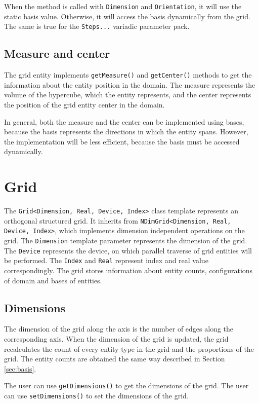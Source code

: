 When the method is called with \texttt{Dimension} and \texttt{Orientation}, it will use the static basis value.
Otherwise, it will access the basis dynamically from the grid.
The same is true for the \texttt{Steps...} variadic parameter pack.

\subsection{Measure and center}

The grid entity implements \texttt{getMeasure()} and \texttt{getCenter()} methods to get the information about the entity position in the domain.
The measure represents the volume of the hypercube, which the entity represents, and the center represents the position of the grid entity center in the domain.

In general, both the measure and the center can be implemented using bases, because the basis represents the directions in which the entity spans.
However, the implementation will be less efficient, because the basis must be accessed dynamically.

\section{Grid}

The \texttt{Grid<Dimension, Real, Device, Index>} class template represents an orthogonal structured grid.
It inherits from \texttt{NDimGrid<Dimension, Real, Device, Index>}, which implements dimension independent operations on the grid.
The \texttt{Dimension} template parameter represents the dimension of the grid.
The \texttt{Device} represents the device, on which parallel traverse of grid entities will be performed.
The \texttt{Index} and \texttt{Real} represent index and real value correspondingly.
The grid stores information about entity counts, configurations of domain and bases of entities.

\subsection{Dimensions}

The dimension of the grid along the axis is the number of edges along the corresponding axis.
When the dimension of the grid is updated, the grid recalculates the count of every entity type in the grid and the proportions of the grid.
The entity counts are obtained the same way described in Section \ref{sec:basis}.

The user can use \texttt{getDimensions()} to get the dimensions of the grid.
The user can use \texttt{setDimensions()} to set the dimensions of the grid.

